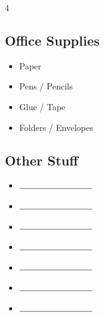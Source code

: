 \documentclass[10pt,letterpaper]{article}
\newcommand{\get}{\item[\Square]}
\begin{document}
\begin{multicols*}{4}
\subsection*{Office Supplies}
\begin{itemize}
\get Paper
\get Pens / Pencils
\get Glue / Tape
\get Folders / Envelopes
\end{itemize}

\subsection*{Other Stuff}
\begin{itemize}
\get $\rule{3cm}{0.15mm}$
\get $\rule{3cm}{0.15mm}$
\get $\rule{3cm}{0.15mm}$
\get $\rule{3cm}{0.15mm}$
\get $\rule{3cm}{0.15mm}$
\get $\rule{3cm}{0.15mm}$
\get $\rule{3cm}{0.15mm}$
\end{itemize}
\end{multicols*}
\end{document}

